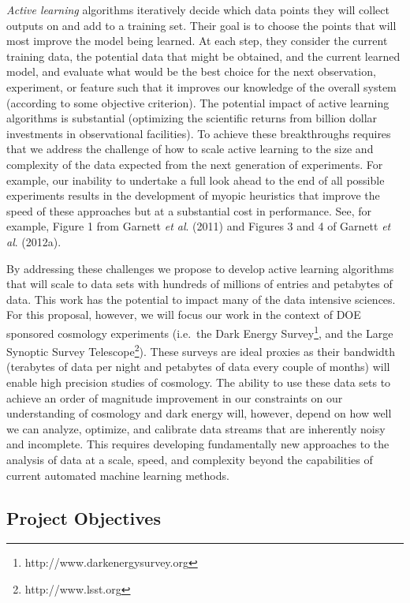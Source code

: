 \documentclass[useAMS,usenatbib,tightenlines,11pt,preprint]{aastex}
\begin{document}
{\it Active learning} algorithms iteratively decide which data
points they will collect outputs on and add to a training set.  Their
goal is to choose the points that will most improve the model being
learned.  At each step, they consider the current training data, the
potential data that might be obtained, and the current learned model,
and evaluate what would be the best choice for the next observation,
experiment, or feature such that it improves our knowledge of the
overall system (according to some objective criterion). The potential
impact of active learning algorithms is substantial (optimizing the
scientific returns from billion dollar investments in observational
facilities). To achieve these breakthroughs requires that we address
the challenge of how to scale active learning to the size and
complexity of the data expected from the next generation of
experiments.  For example, our inability to undertake a full look
ahead to the end of all possible experiments results in the
development of myopic heuristics that improve the speed of these
approaches but at a substantial cost in performance.  See, for example, 
Figure 1 from Garnett {\it et al}. (2011) and Figures
3 and 4 of Garnett {\it et al}. (2012a).

By addressing these challenges we propose to develop active learning
algorithms that will scale to data sets with hundreds of millions of
entries and petabytes of data. This work has the potential to impact
many of the data intensive sciences. For this proposal, however, we
will focus our work in the context of DOE sponsored cosmology
experiments (i.e.\ the Dark Energy
Survey\footnote{http://www.darkenergysurvey.org}, and the Large
Synoptic Survey Telescope\footnote{http://www.lsst.org}). These
surveys are ideal proxies as their bandwidth (terabytes of data per
night and petabytes of data every couple of months) will enable high
precision studies of cosmology. The ability to use these data sets to
achieve an order of magnitude improvement in our constraints on our
understanding of cosmology and dark energy will, however, depend on
how well we can analyze, optimize, and calibrate data streams that are
inherently noisy and incomplete. This requires developing
fundamentally new approaches to the analysis of data at a scale,
speed, and complexity beyond the capabilities of current automated
machine learning methods.

\subsection{Project Objectives}
\label{sec:objectives}
\end{document}
